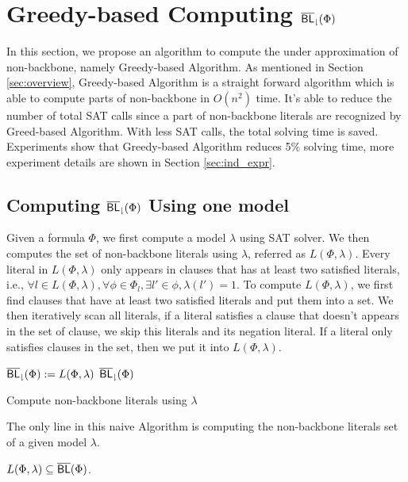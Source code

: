 \section{Greedy-based Computing ${\sf \overline{BL}_\downharpoonright}(\Phi)$} \label{sec:greedy}
In this section, we propose an algorithm to compute the under approximation of non-backbone, namely Greedy-based Algorithm. As mentioned in Section \ref{sec:overview}, Greedy-based Algorithm is a straight forward algorithm which is able to compute parts of non-backbone in $O(n^2)$ time. It's able to reduce the number of total SAT calls since a part of non-backbone literals are recognized by Greed-based Algorithm. With less SAT calls, the total solving time is saved. Experiments show that Greedy-based Algorithm reduces 5\% solving time, more experiment details are shown in Section \ref{sec:ind_expr}.

\subsection{Computing ${\sf \overline{BL}_\downharpoonright}(\Phi)$ Using one model}

Given a formula $\Phi$, we first compute a model $\lambda$ using SAT solver. We then computes the set of non-backbone literals using $\lambda$, referred as $L(\Phi,\lambda)$. Every literal in $L(\Phi,\lambda)$ only appears in clauses that has at least two satisfied literals, i.e., $\forall l\in L(\Phi,\lambda), \forall \phi\in\Phi_l, \exists l'\in\phi, \lambda(l')=1$. To compute $L(\Phi,\lambda)$, we first find clauses that have at least two satisfied literals and put them into a set. We then iteratively scan all literals, if a literal satisfies a clause that doesn't appears in the set of clause, we skip this literals and its negation literal. If a literal only satisfies clauses in the set, then we put it into $L(\Phi,\lambda)$.

\begin{algorithm2e}
\SetAlgoShortEnd
\SetFillComment
{}
${\sf \overline{BL}_\downharpoonright}(\Phi):=L(\Phi,\lambda)$\;
\Return ${\sf \overline{BL}_\downharpoonright}(\Phi)$\;
\caption{Compute non-backbone literals using $\lambda$}
\label{alg:greedy}
\end{algorithm2e}

The only line in this naive Algorithm is computing the non-backbone literals set of a given model $\lambda$.

\begin{theorem} \label{lem:navie}
 $L(\Phi,\lambda)\subseteq\overline{\textsf{BL}}(\Phi)$.
\end{theorem}

